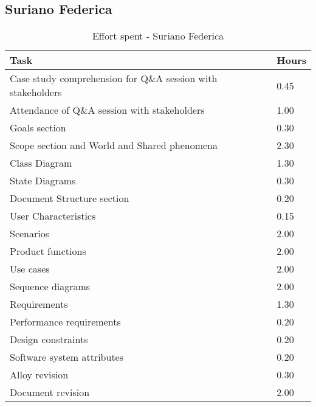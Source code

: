 \subsection{Suriano Federica}
\renewcommand{\arraystretch}{1.8}
\begin{longtable}{|m{9cm}|m{1.2cm}|}
\caption{Effort spent - Suriano Federica}\\
\hline
\endfirsthead
\endhead
\hline
\endlastfoot
\rowcolor{green2}
\textbf{Task} &\hfil {\textbf{Hours}}\\
\hline
Case study comprehension for Q\&A session with stakeholders & \hfil 0.45\\
Attendance of Q\&A session with stakeholders & \hfil 1.00\\
Goals section & \hfil 0.30\\
Scope section and World and Shared phenomena & \hfil 2.30\\
Class Diagram & \hfil 1.30\\
State Diagrams & \hfil 0.30\\
Document Structure section & \hfil 0.20\\
User Characteristics & \hfil 0.15\\
Scenarios  & \hfil 2.00\\
Product functions & \hfil 2.00\\
Use cases & \hfil 2.00\\
Sequence diagrams & \hfil 2.00\\
Requirements & \hfil 1.30\\
Performance requirements & \hfil 0.20\\
Design constraints& \hfil 0.20\\
Software system attributes & \hfil 0.20\\
Alloy revision & \hfil 0.30\\
Document revision & \hfil 2.00\\
\end{longtable}
